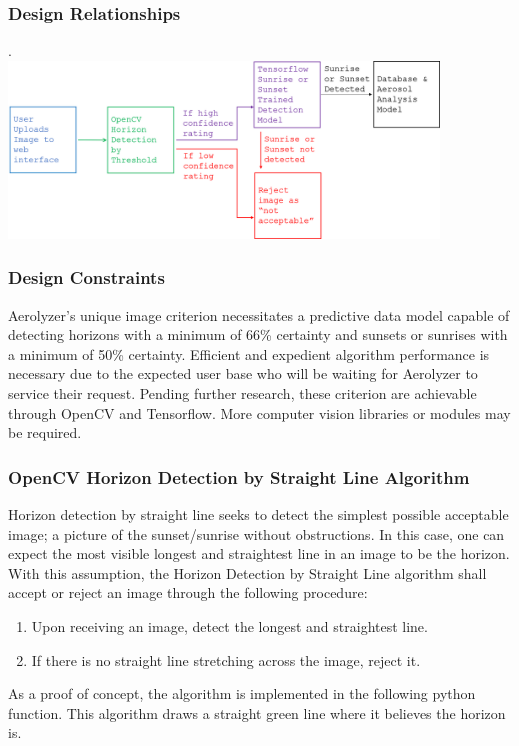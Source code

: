 \documentclass[onecolumn, draftclsnofoot,10pt, compsoc]{IEEEtran}
\begin{document}
\begin{singlespace}
          \subsubsection{Design Relationships}
					.\\
					\includegraphics[width=4.5in,natwidth=1907,natheight=787]{images/tensor.png}

		\subsubsection{Design Constraints}
			Aerolyzer’s unique image criterion necessitates a predictive data model capable of detecting horizons with a minimum of 66\% certainty and sunsets or sunrises with a minimum of 50\% certainty.
			Efficient and expedient algorithm performance is necessary due to the expected user base who will be waiting for Aerolyzer to service their request.
			Pending further research, these criterion are achievable through OpenCV and Tensorflow.
			More computer vision libraries or modules may be required.
	      
		\subsubsection{OpenCV Horizon Detection by Straight Line Algorithm}
			Horizon detection by straight line seeks to detect the simplest possible acceptable image; a picture of the sunset/sunrise without obstructions.
			In this case, one can expect the most visible longest and straightest line in an image to be the horizon.
			With this assumption, the Horizon Detection by Straight Line algorithm shall accept or reject an image through the following procedure:
			\begin{enumerate}
				\item Upon receiving an image, detect the longest and straightest line.
				\item If there is no straight line stretching across the image, reject it.
			\end{enumerate}
			As a proof of concept, the algorithm is implemented in the following python function.
			This algorithm draws a straight green line where it believes the horizon is.
			


\end{singlespace}
\end{document}
